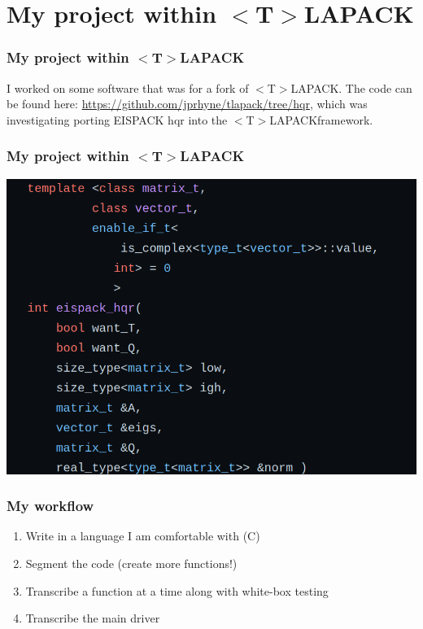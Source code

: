 \documentclass[12pt]{beamer}
\newcommand{\tla}{$<$T$>$LAPACK}
\begin{document}
    \section{My project within \tla}
    \begin{frame}
        \frametitle{My project within \tla}
        I worked on some software that was for a fork of \tla. The code can be found here: 
        \url{https://github.com/jprhyne/tlapack/tree/hqr}, which was investigating porting EISPACK hqr
        into the \tla framework. 
    \end{frame}
    \begin{frame}
        \frametitle{My project within \tla}
        \includegraphics[width=\textwidth]{images/eispackHqr.png}
    \end{frame}
    \begin{frame}
        \frametitle{My workflow}
        \begin{enumerate}
            \item Write in a language I am comfortable with (C)
            \item Segment the code (create more functions!)
            \item Transcribe a function at a time along with white-box testing
            \item Transcribe the main driver
        \end{enumerate}
    \end{frame}
\end{document}
